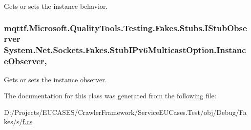 Gets or sets the instance behavior.

\hypertarget{class_system_1_1_net_1_1_sockets_1_1_fakes_1_1_stub_i_pv6_multicast_option_af2209116d3ed34ad06cb259376fa8ba2}{
\subsubsection[{Instance\-Observer}]{\setlength{\rightskip}{0pt plus 5cm}mqttf.\-Microsoft.\-Quality\-Tools.\-Testing.\-Fakes.\-Stubs.\-I\-Stub\-Observer System.\-Net.\-Sockets.\-Fakes.\-Stub\-I\-Pv6\-Multicast\-Option.\-Instance\-Observer\hspace{0.3cm}{\ttfamily [get]}, {\ttfamily [set]}}}\label{class_system_1_1_net_1_1_sockets_1_1_fakes_1_1_stub_i_pv6_multicast_option_af2209116d3ed34ad06cb259376fa8ba2}


Gets or sets the instance observer.



The documentation for this class was generated from the following file\-:\begin{DoxyCompactItemize}
\item 
D\-:/\-Projects/\-E\-U\-C\-A\-S\-E\-S/\-Crawler\-Framework/\-Service\-E\-U\-Cases.\-Test/obj/\-Debug/\-Fakes/s/\hyperlink{s_2f_8cs}{f.\-cs}\end{DoxyCompactItemize}
